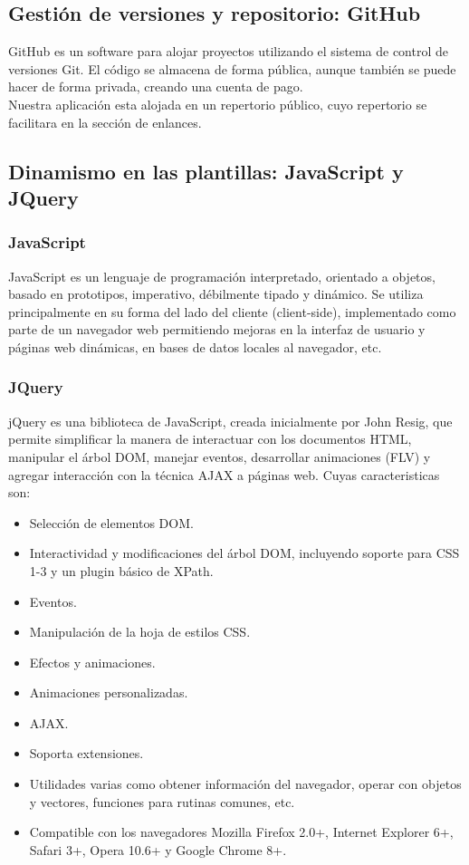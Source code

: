 \subsection{Gestión de versiones y repositorio: GitHub}

GitHub es un software para alojar proyectos utilizando el sistema de control de versiones Git. 
El código se almacena de forma pública, aunque también se puede hacer de forma privada, creando una cuenta de pago.\\

Nuestra aplicación esta alojada en un repertorio público, cuyo repertorio se facilitara en la sección de enlances.

\subsection{Dinamismo en las plantillas: JavaScript y JQuery}

\subsubsection{JavaScript}
JavaScript es un lenguaje de programación interpretado, orientado a objetos, basado en prototipos, imperativo, débilmente tipado y dinámico. 
Se utiliza principalmente en su forma del lado del cliente (client-side), implementado como parte de un navegador web permitiendo mejoras en 
la interfaz de usuario y páginas web dinámicas, en bases de datos locales al navegador, etc.

\subsubsection{JQuery}
jQuery es una biblioteca de JavaScript, creada inicialmente por John Resig, que permite simplificar la manera de interactuar con los documentos HTML,
manipular el árbol DOM, manejar eventos, desarrollar animaciones (FLV) y agregar interacción con la técnica AJAX a páginas web. Cuyas caracteristicas son:

\begin{itemize}
  \item Selección de elementos DOM.
  \item Interactividad y modificaciones del árbol DOM, incluyendo soporte para CSS 1-3 y un plugin básico de XPath.
  \item Eventos.
  \item Manipulación de la hoja de estilos CSS.
  \item Efectos y animaciones.
  \item Animaciones personalizadas.
  \item AJAX.
  \item Soporta extensiones.
  \item Utilidades varias como obtener información del navegador, operar con objetos y vectores, funciones para rutinas comunes, etc.
  \item Compatible con los navegadores Mozilla Firefox 2.0+, Internet Explorer 6+, Safari 3+, Opera 10.6+ y Google Chrome 8+.
\end{itemize}

